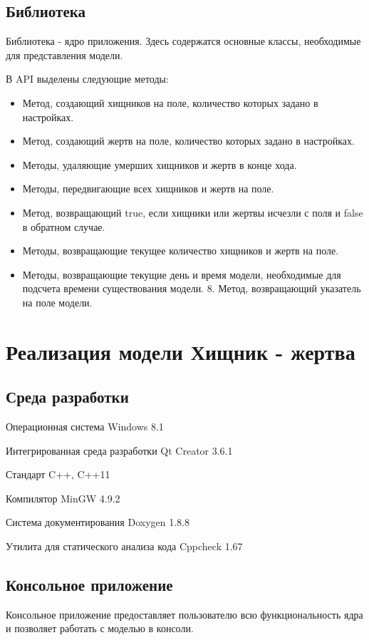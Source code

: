 \documentclass[a4paper]{article}
\begin{document}
\subsection{Библиотека}
Библиотека  - ядро приложения. Здесь содержатся основные классы, необходимые для представления модели. 

\noindent В API выделены следующие методы: 
\begin{itemize}
\item Метод, создающий хищников на поле, количество которых задано в настройках.
\item Метод, создающий жертв на поле, количество которых задано в настройках.
\item Методы, удаляющие умерших хищников и жертв в конце хода.
\item Методы, передвигающие всех хищников и жертв на поле.
\item Метод, возвращающий true, если хищники или жертвы исчезли с поля и false в обратном случае.
\item Методы, возвращающие текущее количество хищников и жертв на поле.
\item Методы, возвращающие текущие день и время модели, необходимые для подсчета времени существования модели. 
8. Метод, возвращающий указатель на поле модели. 
\end{itemize}


\section{Реализация модели Хищник - жертва}
\subsection{Среда разработки}
\noindent Операционная система Windows 8.1

\noindent Интегрированная среда разработки Qt Creator 3.6.1

\noindent Стандарт C++, C++11

\noindent Компилятор MinGW 4.9.2 

\noindent Система документирования Doxygen 1.8.8

\noindent Утилита для статического анализа кода Cppcheck 1.67

\subsection{Консольное приложение}
Консольное приложение предоставляет пользователю всю функциональность ядра и позволяет работать с моделью в консоли. 
\end{document}
